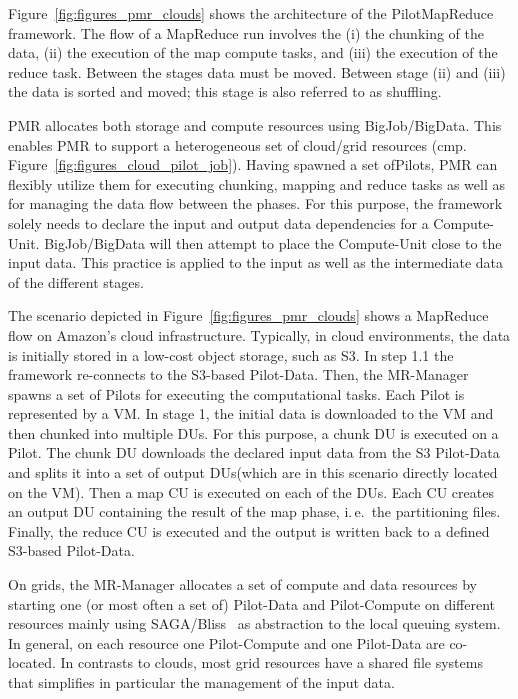 \documentclass[times]{cpeauth}
\newcommand{\pilot}{Pilot\xspace}
\newcommand{\pilots}{Pilots\xspace}
\newcommand{\pilotcompute}{Pilot-Compute\xspace}
\newcommand{\pilotdata}{Pilot-Data\xspace}
\newcommand{\pilotmapreduce}{PilotMapReduce\xspace}
\newcommand{\mrmg}{MR-Manager\xspace}
\newcommand{\computeunit}{Compute-Unit\xspace}
\newcommand{\du}{DU\xspace}
\newcommand{\dus}{DUs\xspace}
\newcommand{\cu}{CU\xspace}
\begin{document}
Figure~\ref{fig:figures_pmr_clouds} shows the architecture of the
\pilotmapreduce framework. The flow of a MapReduce run involves the (i) the 
chunking of the data, (ii) the execution of the map compute tasks, and (iii) 
the execution of the reduce task. Between the stages data must be moved. 
Between stage (ii) and (iii) the data is sorted and moved; this stage is also 
referred to as shuffling.

PMR allocates both storage and compute resources
using BigJob/BigData. This enables PMR to support a heterogeneous set of
cloud/grid resources (cmp. Figure~\ref{fig:figures_cloud_pilot_job}). Having
spawned a set of\pilots, PMR can flexibly utilize them for executing chunking,
mapping and reduce tasks as well as for managing the data flow between the
phases. For this purpose, the framework solely needs to declare the input and
output data dependencies for a \computeunit. BigJob/BigData will then attempt
to place the \computeunit close to the input data. This practice is applied to
the input as well as the intermediate data of the different stages.


The scenario depicted in Figure~\ref{fig:figures_pmr_clouds} shows a MapReduce
flow on Amazon's cloud infrastructure. Typically, in cloud environments, the
data is initially stored in a low-cost object storage, such as S3. In step 1.1
the framework re-connects to the S3-based \pilotdata. Then, the \mrmg spawns a
set of \pilots for executing the computational tasks. Each \pilot is
represented by a VM. In stage 1, the initial data is downloaded to the VM and
then chunked into multiple \dus. For this purpose, a chunk \du is executed on
a \pilot. The chunk \du downloads the declared input data from the S3
\pilotdata and splits it into a set of output \dus (which are in this scenario
directly located on the VM). Then a map \cu is executed on each of the \dus.
Each \cu creates an output \du containing the result of the map phase, i.\,e.\
the partitioning files. Finally, the reduce \cu is executed and the output is
written back to a defined S3-based \pilotdata.


On grids, the \mrmg allocates a set of compute and data resources by starting
one (or most often a set of) \pilotdata and \pilotcompute on different
resources mainly using SAGA/Bliss~\cite{saga-bliss-pd} as abstraction to the
local queuing system. In general, on each resource one \pilotcompute and one
\pilotdata are co-located. In contrasts to clouds, most grid resources have a
shared file systems that simplifies in particular the management of the input
data.
\end{document}
